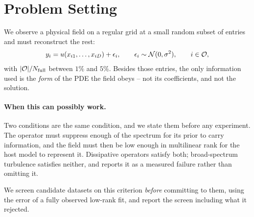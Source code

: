 \section{Problem Setting}
\label{sec:problem}

We observe a physical field on a regular grid at a small random subset of
entries and must reconstruct the rest:
\begin{equation}
  y_i = u(x_{i1},\dots,x_{iD}) + \epsilon_i,
  \qquad \epsilon_i \sim \mathcal{N}(0,\sigma^2),
  \qquad i \in \mathcal{O},
  \label{eq:likelihood}
\end{equation}
with $|\mathcal{O}| / N_{\mathrm{full}}$ between $1\%$ and $5\%$.  Besides those
entries, the only information used is the \emph{form} of the PDE the field
obeys -- not its coefficients, and not the solution.

\paragraph{When this can possibly work.}
Two conditions are the same condition, and we state them before any experiment.
The operator must suppress enough of the spectrum for its prior to carry
information, and the field must then be low enough in multilinear rank for the
host model to represent it.  Dissipative operators satisfy both; broad-spectrum
turbulence satisfies neither, and  reports it as a
measured failure rather than omitting it.

We screen candidate datasets on this criterion \emph{before} committing to them,
using the error of a fully observed low-rank fit, and report the screen
including what it rejected.
